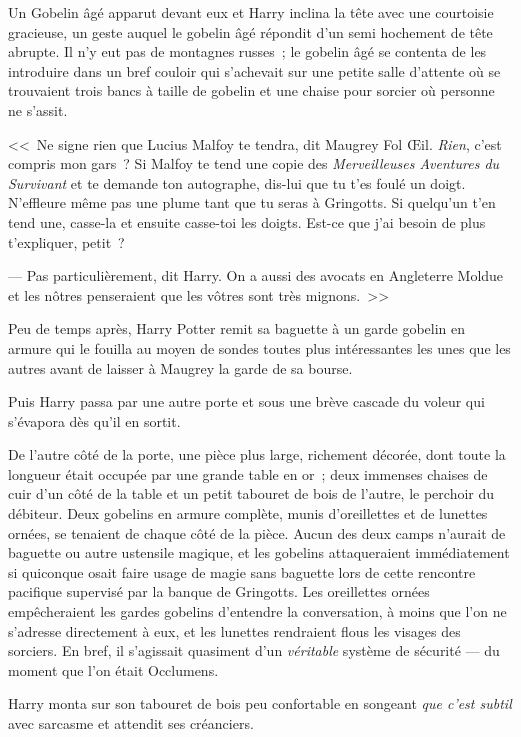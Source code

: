 Un Gobelin âgé apparut devant eux et Harry inclina la tête avec une courtoisie gracieuse, un geste auquel le gobelin âgé répondit d'un semi hochement de tête abrupte. Il n'y eut pas de montagnes russes~; le gobelin âgé se contenta de les introduire dans un bref couloir qui s'achevait sur une petite salle d'attente où se trouvaient trois bancs à taille de gobelin et une chaise pour sorcier où personne ne s'assit.

<<~Ne signe rien que Lucius Malfoy te tendra, dit Maugrey Fol Œil. \emph{Rien}, c'est compris mon gars~? Si Malfoy te tend une copie des \emph{Merveilleuses Aventures du Survivant} et te demande ton autographe, dis-lui que tu t'es foulé un doigt. N'effleure même pas une plume tant que tu seras à Gringotts. Si quelqu'un t'en tend une, casse-la et ensuite casse-toi les doigts. Est-ce que j'ai besoin de plus t'expliquer, petit~?

--- Pas particulièrement, dit Harry. On a aussi des avocats en Angleterre Moldue et les nôtres penseraient que les vôtres sont très mignons.~>>

Peu de temps après, Harry Potter remit sa baguette à un garde gobelin en armure qui le fouilla au moyen de sondes toutes plus intéressantes les unes que les autres avant de laisser à Maugrey la garde de sa bourse.

Puis Harry passa par une autre porte et sous une brève cascade du voleur qui s'évapora dès qu'il en sortit.

De l'autre côté de la porte, une pièce plus large, richement décorée, dont toute la longueur était occupée par une grande table en or~; deux immenses chaises de cuir d'un côté de la table et un petit tabouret de bois de l'autre, le perchoir du débiteur. Deux gobelins en armure complète, munis d'oreillettes et de lunettes ornées, se tenaient de chaque côté de la pièce. Aucun des deux camps n'aurait de baguette ou autre ustensile magique, et les gobelins attaqueraient immédiatement si quiconque osait faire usage de magie sans baguette lors de cette rencontre pacifique supervisé par la banque de Gringotts. Les oreillettes ornées empêcheraient les gardes gobelins d'entendre la conversation, à moins que l'on ne s'adresse directement à eux, et les lunettes rendraient flous les visages des sorciers. En bref, il s'agissait quasiment d'un \emph{véritable} système de sécurité — du moment que l'on était Occlumens.

Harry monta sur son tabouret de bois peu confortable en songeant \emph{que c'est subtil} avec sarcasme et attendit ses créanciers.

